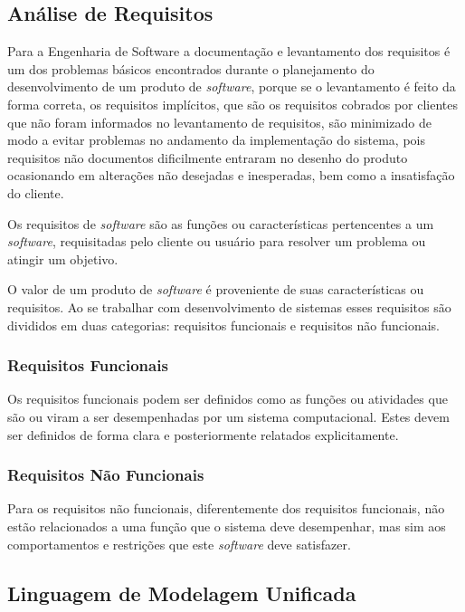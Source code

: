 \subsection{Análise de Requisitos}

Para a Engenharia de Software a documentação e levantamento dos requisitos é um dos problemas básicos encontrados durante o planejamento do desenvolvimento de um produto de \textit{software}, porque se o levantamento é feito da forma correta, os requisitos implícitos, que são os requisitos cobrados por clientes que não foram informados no levantamento de requisitos, são minimizado de modo a evitar problemas no andamento da implementação do sistema, pois requisitos não documentos dificilmente entraram no desenho do produto ocasionando em alterações não desejadas e inesperadas, bem como a insatisfação do cliente. \cite{padua}

Os requisitos de \textit{software} são as funções ou características pertencentes a um \textit{software}, requisitadas pelo cliente ou usuário para resolver um problema ou atingir um objetivo. \cite{eee1990}

O valor de um produto de \textit{software} é proveniente de suas características ou requisitos. Ao se trabalhar com desenvolvimento de sistemas esses requisitos são divididos em duas categorias: requisitos funcionais e requisitos não funcionais. \cite{padua}

\subsubsection{Requisitos Funcionais}

Os requisitos funcionais podem ser definidos como as funções ou atividades que são ou viram a ser desempenhadas por um sistema computacional. Estes devem ser definidos de forma clara e posteriormente relatados explicitamente. \cite{sommerville}

\subsubsection{Requisitos Não Funcionais}

Para  os requisitos não funcionais, diferentemente dos requisitos funcionais, não estão relacionados a uma função que o sistema deve desempenhar, mas sim aos comportamentos e restrições que este \textit{software} deve satisfazer.

\subsection{Linguagem de Modelagem Unificada}

